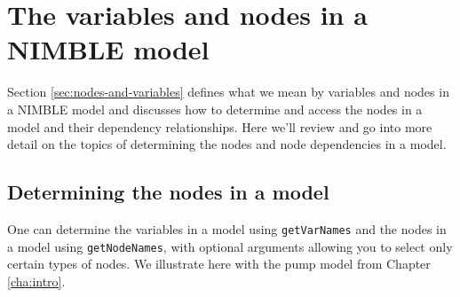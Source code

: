 \documentclass[12pt,oneside]{book}\usepackage[]{graphicx}\usepackage[]{color}
\def\cd#1{\texttt{#1}}
\begin{document}
\section{The variables and nodes in a NIMBLE model}
\label{sec:accessing-variables}

Section \ref{sec:nodes-and-variables} defines what we mean by variables and nodes in a NIMBLE model and discusses how to determine and access the nodes in a model and their dependency relationships. Here we'll review and go into more detail on the topics of determining the nodes and node dependencies in a model.

\subsection{Determining the nodes in a model}
\label{sec:get-nodes}


One can determine the variables in a model using \cd{getVarNames} and the  nodes in a model using \cd{getNodeNames}, with optional arguments allowing you to select only certain types of nodes. We illustrate here with the pump model from Chapter \ref{cha:intro}.
\end{document}
